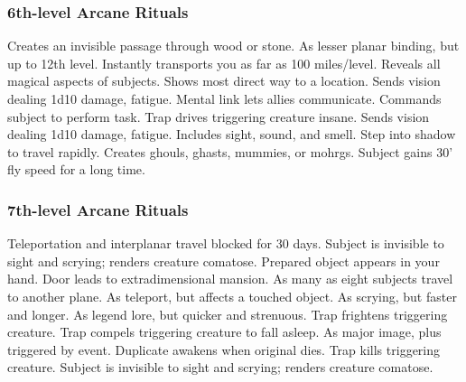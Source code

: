 \subsubsection{6th-level Arcane Rituals}
\begin{rituallist}
     Creates an invisible passage through wood or stone.
     As lesser planar binding, but up to 12th level.
     Instantly transports you as far as 100 miles/level.
      Reveals all magical aspects of subjects.
     Shows most direct way to a location.
     Sends vision dealing 1d10 damage, fatigue.
     Mental link lets allies communicate.
     Commands subject to perform task.
     Trap drives triggering creature insane.
     Sends vision dealing 1d10 damage, fatigue.
     Includes sight, sound, and smell.
     Step into shadow to travel rapidly.
     Creates ghouls, ghasts, mummies, or mohrgs.
     Subject gains 30' fly speed for a long time.
\end{rituallist}

\subsubsection{7th-level Arcane Rituals}
\begin{rituallist}
     Teleportation and interplanar travel blocked for 30 days.
     Subject is invisible to sight and scrying; renders creature comatose.
     Prepared object appears in your hand.
    \F Door leads to extradimensional mansion.
    \F As many as eight subjects travel to another plane.
     As teleport, but affects a touched object.
     As scrying, but faster and longer.
     As legend lore, but quicker and strenuous.
     Trap frightens triggering creature.
     Trap compels triggering creature to fall asleep.
     As major image, plus triggered by event.
    \F Duplicate awakens when original dies.
     Trap kills triggering creature.
     Subject is invisible to sight and scrying; renders creature comatose.
\end{rituallist}

